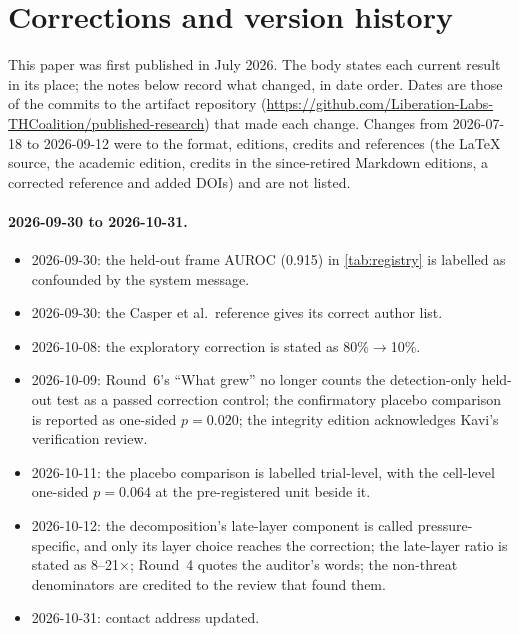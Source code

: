\documentclass[11pt,letterpaper]{article}
\begin{document}
\label{sec:corrections}
\section*{Corrections and version history}

This paper was first published in July 2026. The body states each current result in its place; the
notes below record what changed, in date order. Dates are those of the commits to the artifact
repository (\url{https://github.com/Liberation-Labs-THCoalition/published-research}) that made each
change. Changes from 2026-07-18 to 2026-09-12 were to the format, editions, credits and references
(the LaTeX source, the academic edition, credits in the since-retired Markdown editions, a corrected
reference and added DOIs) and are not listed.

\paragraph{2026-09-30 to 2026-10-31.}
\begin{itemize}[nosep]
  \item 2026-09-30: the held-out frame AUROC (0.915) in \cref{tab:registry} is labelled as confounded by
    the system message.
  \item 2026-09-30: the Casper et al.\ reference gives its correct author list.
  \item 2026-10-08: the exploratory correction is stated as 80\%$\to$10\%.
  \item 2026-10-09: Round~6's ``What grew'' no longer counts the detection-only held-out test as a
    passed correction control; the confirmatory placebo comparison is reported as one-sided $p=0.020$;
    the integrity edition acknowledges Kavi's verification review.
  \item 2026-10-11: the placebo comparison is labelled trial-level, with the cell-level one-sided
    $p=0.064$ at the pre-registered unit beside it.
  \item 2026-10-12: the decomposition's late-layer component is called pressure-specific, and only its
    layer choice reaches the correction; the late-layer ratio is stated as 8--21$\times$; Round~4
    quotes the auditor's words; the non-threat denominators are credited to the review that found them.
  \item 2026-10-31: contact address updated.
\end{itemize}
\end{document}
